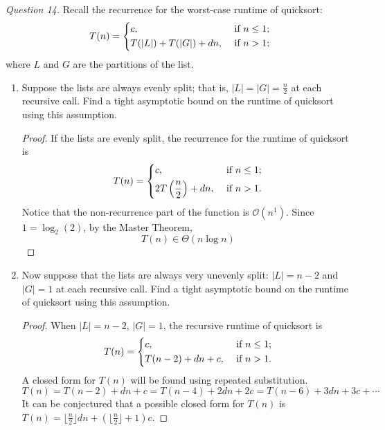 \documentclass[11pt]{article}
\begin{document}
    \textit{Question 14.} Recall the recurrence for the worst-case runtime of quicksort:
    \[
        T(n)=\begin{dcases}
            c, &\text{ if } n\leq 1;\\
            T(|L|)+T(|G|) + dn, &\text{ if } n>1;\\
        \end{dcases}
    \]
    where \(L\) and \(G\) are the partitions of the list.
    \begin{enumerate}
        \item Suppose the lists are always evenly split; that is, \(|L| = |G| = \frac{n}{2}\) at each recursive call. Find a tight asymptotic bound on the runtime of quicksort using this assumption.
        
        \begin{proof}
            If the lists are evenly split, the recurrence for the runtime of quicksort is
            \[
                T(n)=\begin{dcases}
                    c, &\text{ if } n \leq 1 ;\\
                    2T\left(\frac{n}{2}\right) + dn, &\text{ if } n >1 .
                \end{dcases}
            \]
            Notice that the non-recurrence part of the function is \(\mathcal{O} (n^1)\). Since \(1 = \log _2(2)\), by the Master Theorem,
            \[
                T(n) \in \Theta(n\log n)
            \]
        \end{proof}
        \item Now suppose that the lists are always very unevenly split: \(|L| = n-2\) and \(|G| = 1\) at each recursive call. Find a tight asymptotic bound on the runtime of quicksort using this assumption.
        
        \begin{proof}
            When \(|L| = n-2\), \(|G| =1\), the recursive runtime of quicksort is
            \[
                T(n)= \begin{dcases}
                    c, &\text{ if } n \leq 1 ;\\
                    T(n-2) + dn + c, &\text{ if } n > 1 .
                \end{dcases}
            \]
            A closed form for \(T(n)\) will be found using repeated substitution.
            \[
                T(n) = T(n-2) + dn + c = T(n-4) + 2dn + 2c = T(n-6) + 3dn + 3c + \cdots
            \]
            It can be conjectured that a possible closed form for \(T(n)\) is \(T(n) = \lfloor \frac{n}{2} \rfloor dn + \left( \lfloor \frac{n}{2} \rfloor + 1 \right) c\).


\end{proof}
\end{enumerate}
\end{document}
